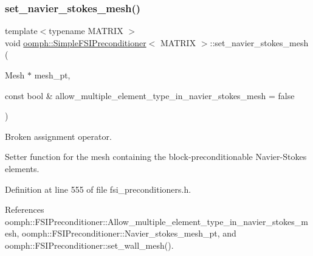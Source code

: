 \mbox{\label{classoomph_1_1SimpleFSIPreconditioner_ab9c5875d7186cfb5c55cecb72bed50b3}} 
\subsubsection{\texorpdfstring{set\+\_\+navier\+\_\+stokes\+\_\+mesh()}{set\_navier\_stokes\_mesh()}}
{\footnotesize\ttfamily template$<$typename M\+A\+T\+R\+IX $>$ \\
void \hyperlink{classoomph_1_1SimpleFSIPreconditioner}{oomph\+::\+Simple\+F\+S\+I\+Preconditioner}$<$ M\+A\+T\+R\+IX $>$\+::set\+\_\+navier\+\_\+stokes\+\_\+mesh (\begin{DoxyParamCaption}\item[{Mesh $\ast$}]{mesh\+\_\+pt,  }\item[{const bool \&}]{allow\+\_\+multiple\+\_\+element\+\_\+type\+\_\+in\+\_\+navier\+\_\+stokes\+\_\+mesh = {\ttfamily false} }\end{DoxyParamCaption})\hspace{0.3cm}{\ttfamily [inline]}}



Broken assignment operator. 

Setter function for the mesh containing the block-\/preconditionable Navier-\/\+Stokes elements. 

Definition at line 555 of file fsi\+\_\+preconditioners.\+h.



References oomph\+::\+F\+S\+I\+Preconditioner\+::\+Allow\+\_\+multiple\+\_\+element\+\_\+type\+\_\+in\+\_\+navier\+\_\+stokes\+\_\+mesh, oomph\+::\+F\+S\+I\+Preconditioner\+::\+Navier\+\_\+stokes\+\_\+mesh\+\_\+pt, and oomph\+::\+F\+S\+I\+Preconditioner\+::set\+\_\+wall\+\_\+mesh().

\mbox{\label{classoomph_1_1SimpleFSIPreconditioner_a324b53aaedfc8f0a2cc3da921ef94686}} 
